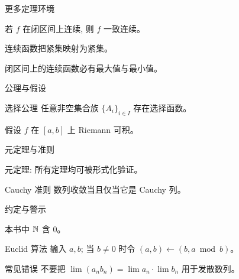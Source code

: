 
\begin{frame}{更多定理环境}
  \begin{lemma}{}{}
    若 $f$ 在闭区间上连续, 则 $f$ 一致连续。
  \end{lemma}

  \begin{proposition}{}{}
    连续函数把紧集映射为紧集。
  \end{proposition}

  \begin{corollary}{}{}
    闭区间上的连续函数必有最大值与最小值。
  \end{corollary}
\end{frame}

\begin{frame}{公理与假设}
  \begin{axiom}{选择公理}{}
    任意非空集合族 $\{A_i\}_{i \in I}$ 存在选择函数。
  \end{axiom}

  \begin{hypothesis}{}{}
    假设 $f$ 在 $[a, b]$ 上 Riemann 可积。
  \end{hypothesis}
\end{frame}

\begin{frame}{元定理与准则}
  \begin{metatheorem}{}{}
    元定理: 所有定理均可被形式化验证。
  \end{metatheorem}

  \begin{criteria}{Cauchy 准则}{}
    数列收敛当且仅当它是 Cauchy 列。
  \end{criteria}
\end{frame}

\begin{frame}{约定与警示}
  \begin{convention}{}{}
    本书中 $\mathbb{N}$ 含 $0$。
  \end{convention}

  \begin{algorithm}{Euclid 算法}{}
    输入 $a, b$; 当 $b \neq 0$ 时令 $(a, b) \leftarrow (b, a \bmod b)$。
  \end{algorithm}

  \begin{alarm}{常见错误}{}
    不要把 $\lim (a_n b_n) = \lim a_n \cdot \lim b_n$ 用于发散数列。
  \end{alarm}
\end{frame}

